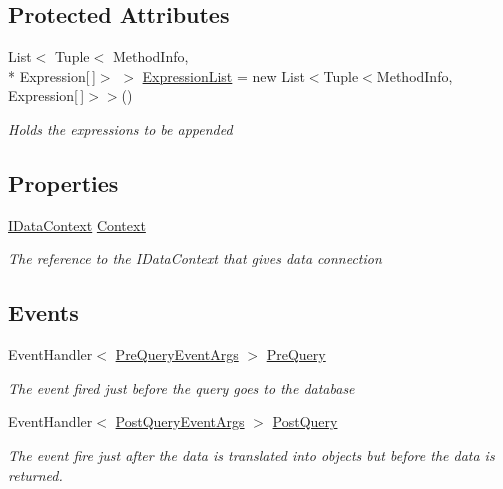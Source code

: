 \subsection*{Protected Attributes}
\begin{DoxyCompactItemize}
\item 
List$<$ Tuple$<$ Method\-Info, \\*
Expression\mbox{[}$\,$\mbox{]}$>$ $>$ \hyperlink{class_highway_1_1_data_1_1_query_objects_1_1_query_base_a22b740c6d5ff1bfc7d5fd96f26c751b8}{Expression\-List} = new List$<$Tuple$<$Method\-Info, Expression\mbox{[}$\,$\mbox{]}$>$$>$()
\begin{DoxyCompactList}\small\item\em Holds the expressions to be appended \end{DoxyCompactList}\end{DoxyCompactItemize}
\subsection*{Properties}
\begin{DoxyCompactItemize}
\item 
\hyperlink{interface_highway_1_1_data_1_1_interfaces_1_1_i_data_context}{I\-Data\-Context} \hyperlink{class_highway_1_1_data_1_1_query_objects_1_1_query_base_aa8ca309734c39e9e78853e2a76c041f1}{Context}
\begin{DoxyCompactList}\small\item\em The reference to the I\-Data\-Context that gives data connection \end{DoxyCompactList}\end{DoxyCompactItemize}
\subsection*{Events}
\begin{DoxyCompactItemize}
\item 
Event\-Handler$<$ \hyperlink{class_highway_1_1_data_1_1_interceptors_1_1_events_1_1_pre_query_event_args}{Pre\-Query\-Event\-Args} $>$ \hyperlink{class_highway_1_1_data_1_1_query_objects_1_1_query_base_a0f4a7c6fcd8e32c461633855ed00f824}{Pre\-Query}
\begin{DoxyCompactList}\small\item\em The event fired just before the query goes to the database \end{DoxyCompactList}\item 
Event\-Handler$<$ \hyperlink{class_highway_1_1_data_1_1_interceptors_1_1_events_1_1_post_query_event_args}{Post\-Query\-Event\-Args} $>$ \hyperlink{class_highway_1_1_data_1_1_query_objects_1_1_query_base_a75da4f1ac849eac015645365f982a9ff}{Post\-Query}
\begin{DoxyCompactList}\small\item\em The event fire just after the data is translated into objects but before the data is returned. \end{DoxyCompactList}\end{DoxyCompactItemize}


